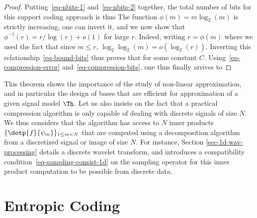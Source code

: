 \begin{proof}
Putting~\eqref{eq-nbits-1} and~\eqref{eq-nbits-2} together, the total number of bits for this support coding approach is thus
The function $\phi(m) = m \log_2(m)$ is strictly increasing, one can invert it, and we now show that $\phi^{-1}(r) = r/\log(r) + o(1)$ for large $r$. Indeed, writing $r=\phi(m)$ 
where we used the fact that since $m \leq r$, $\log_2\log_2(m) = o(\log_2(r))$.
%
Inverting this relationship~\eqref{eq-bound-bits} thus proves that 
for some constant $C$. 
%
Using~\eqref{eq-compression-error} and~\eqref{eq-compression-bits}, one thus finally arrives to 
\end{proof}


This theorem shows the importance of the study of non-linear approximation, and in particular the design of bases that are efficient for approximation of a given signal model $\Th$.
%
Let us also insists on the fact that a practical compression algorithm is only capable of dealing with discrete signals of size $N$. We thus considers that the algorithm has access to $N$ inner products $\{ \dotp{f}{\psi_m} \}_{1 \leq m < N}$ that are computed using a decomposition algorithm from a discretized signal or image of size $N$. For instance, Section \ref{sec-1d-wav-processing} details a discrete wavelet transform, and introduces a compatibility condition~\eqref{eq-sampling-consist-1d} on the sampling operator for this inner product computation to be possible from discrete data. 





\section{Entropic Coding}
\label{subsec-entropic-coding}

